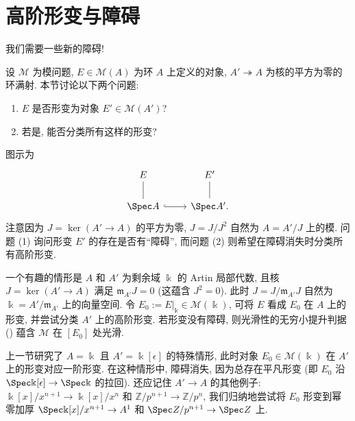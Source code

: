 \section{高阶形变与障碍}\label{src:C.2}
\begin{epigraph}
我们需要一些新的障碍!
\end{epigraph}
设 $\mathcal M$ 为模问题, $E\in\mathcal M(A)$ 为环 $A$ 上定义的对象, $A'\twoheadrightarrow A$ 为核的平方为零的环满射. 本节讨论以下两个问题:
\begin{enumerate}[(1)]
\item $E$ 是否形变为对象 $E'\in\mathcal M(A')$?
\item 若是, 能否分类所有这样的形变?
\end{enumerate}
图示为
\[
\begin{tikzcd}
E\arrow[d,no head]&E'\arrow[d,no head]\\
\Spec A\arrow[r,hook]&\Spec A'.
\end{tikzcd}
\]
注意因为 $J=\ker(A'\to A)$ 的平方为零, $J=J/J^2$ 自然为 $A=A'/J$ 上的模. 问题 (1) 询问形变 $E'$ 的存在是否有``障碍'', 而问题 (2) 则希望在障碍消失时分类所有高阶形变.

一个有趣的情形是 $A$ 和 $A'$ 为剩余域 $\Bbbk$ 的 Artin 局部代数, 且核 $J=\ker(A'\to A)$ 满足 $\mathfrak m_{A'}J=0$ (这蕴含 $J^2=0$). 此时 $J=J/\mathfrak m_{A'}J$ 自然为 $\Bbbk=A'/\mathfrak m_{A'}$ 上的向量空间. 令 $E_0:=E|_{\Bbbk}\in\mathcal M(\Bbbk)$, 可将 $E$ 看成 $E_0$ 在 $A$ 上的形变, 并尝试分类 $A'$ 上的高阶形变. 若形变没有障碍, 则光滑性的无穷小提升判据 () 蕴含 $\mathcal M$ 在 $[E_0]$ 处光滑.

上一节研究了 $A=\Bbbk$ 且 $A'=\Bbbk[\epsilon]$ 的特殊情形, 此时对象 $E_0\in\mathcal M(\Bbbk)$ 在 $A'$ 上的形变对应一阶形变. 在这种情形中, 障碍消失, 因为总存在平凡形变 (即 $E_0$ 沿 $\Spec\Bbbk[\epsilon]\to\Spec\Bbbk$ 的拉回). 还应记住 $A'\to A$ 的其他例子: $\Bbbk[x]/x^{n+1}\to\Bbbk[x]/x^n$ 和 $\mathbb Z/p^{n+1}\to\mathbb Z/p^n$, 我们归纳地尝试将 $E_0$ 形变到幂零加厚 $\Spec\Bbbk[x]/x^{n+1}\to\mathbb A^1$ 和 $\Spec\mathbb Z/p^{n+1}\to\Spec\mathbb Z$ 上.
